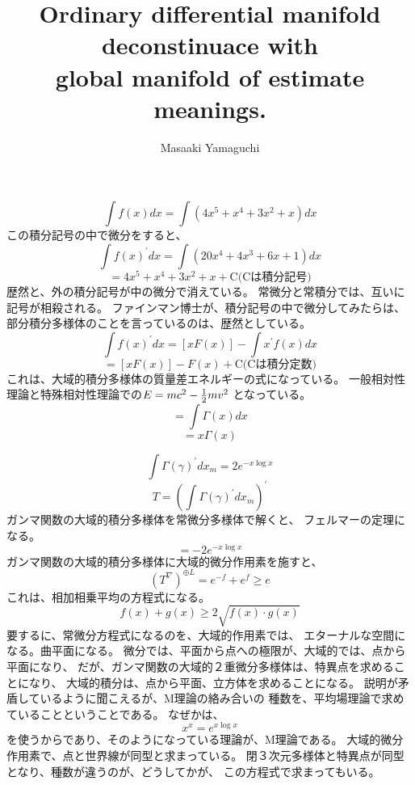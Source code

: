 \documentclass{jsarticle}
\begin{document}
\title{Ordinary differential manifold deconstinuace with \\
global manifold of estimate meanings.}
\author{Masaaki Yamaguchi}
\date{}
\maketitle

    $$ \int f(x)dx = \int (4x^5 + x^4 + 3x^2 + x) dx$$
    この積分記号の中で微分をすると、
    $$ \int f(x)^{'} dx = \int ({20x^4 + 4x^3 + 6x +1})dx $$
    $$ = 4x^5 + x^4 + 3x^2 + x + \text{C(Cは積分記号)} $$
    歴然と、外の積分記号が中の微分で消えている。
    常微分と常積分では、互いに記号が相殺される。
    ファインマン博士が、積分記号の中で微分してみたらは、
    部分積分多様体のことを言っているのは、歴然としている。
    $$ \int f(x)^{'}dx = [xF(x)] - \int x^{'}f(x)dx $$
    $$ = [xF(x)] - F(x) + \text{C(Cは積分定数)} $$
    これは、大域的積分多様体の質量差エネルギーの式になっている。
    一般相対性理論と特殊相対性理論での$ E = mc^2 - {1 \over 2}mv^2 $
    となっている。
    $$ = \int \Gamma(x)dx $$
    $$ = x\Gamma(x) $$

    $$ \int \Gamma(\gamma)^{'}dx_m = 2e^{-x \log x} $$
    $$ T =  \left(\int \Gamma(\gamma)^{'}dx_m\right)^{'}   $$
    ガンマ関数の大域的積分多様体を常微分多様体で解くと、
    フェルマーの定理になる。
     $$ = -2 e^{-x \log x} $$
    ガンマ関数の大域的積分多様体に大域的微分作用素を施すと、
    $$ {(T^{\nabla})}^{\oplus L} = e^{-f} + e^{f} \ge e $$
    これは、相加相乗平均の方程式になる。
    $$ f(x) + g(x) \ge {2\sqrt{f(x)\cdot g(x)}} $$
    要するに、常微分方程式になるのを、大域的作用素では、
    エターナルな空間になる。曲平面になる。
    微分では、平面から点への極限が、大域的では、点から平面になり、
    だが、ガンマ関数の大域的２重微分多様体は、特異点を求めることになり、
    大域的積分は、点から平面、立方体を求めることになる。
    説明が矛盾しているように聞こえるが、M理論の絡み合いの
    種数を、平均場理論で求めていることということである。
    なぜかは、
    $$ x^x = e^{x \log x} $$
    を使うからであり、そのようになっている理論が、M理論である。
    大域的微分作用素で、点と世界線が同型と求まっている。
    閉３次元多様体と特異点が同型となり、種数が違うのが、どうしてかが、
    この方程式で求まってもいる。
\end{document}
